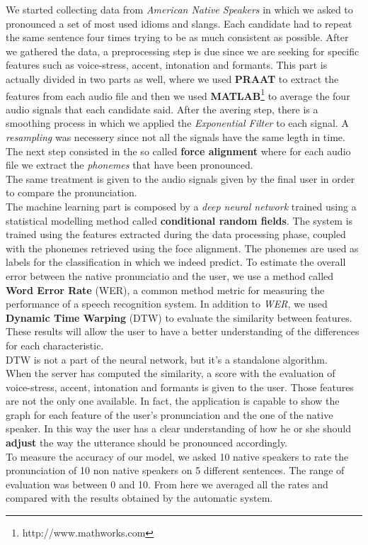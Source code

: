 \noindent We started collecting data from \textit{American Native Speakers} in which we asked to pronounced a set of most used idioms and slangs. Each candidate had to repeat the same sentence four times trying to be as much consistent as possible. After we gathered the data, a preprocessing step is due since we are seeking for specific features such as voice-stress, accent, intonation and formants. This part is actually divided in two parts as well, where we used \textbf{PRAAT}\cite{boersma2010p} to extract the features from each audio file and then we used \textbf{MATLAB}\footnote{http://www.mathworks.com} to average the four audio signals that each candidate said. After the avering step, there is a smoothing process in which we applied the \textit{Exponential Filter} to each signal. A \textit{resampling} was necessery since not all the signals have the same legth in time. The next step consisted in the so called \textbf{force alignment} where for each audio file we extract the \textit{phonemes} that have been pronounced. \\
\noindent The same treatment is given to the audio signals given by the final user in order to compare the pronunciation. \\

\noindent The machine learning part is composed by a \textit{deep neural network} trained using a statistical modelling method called \textbf{conditional random fields}. The system is trained using the features extracted during the data processing phase, coupled with the phonemes retrieved using the foce alignment. The phonemes are used as labels for the classification in which we indeed predict. To estimate the overall error between the native pronunciatio and the user, we use a method called \textbf{Word Error Rate} (WER), a common method metric for measuring the performance of a speech recognition system. In addition to \textit{WER}, we used \textbf{Dynamic Time Warping} (DTW) to evaluate the similarity between features. These results will allow the user to have a better understanding of the differences for each characteristic. \\
\noindent DTW is not a part of the neural network, but it's a standalone algorithm. \\

\noindent When the server has computed the similarity, a score with the evaluation of voice-stress, accent, intonation and formants is given to the user. Those features are not the only one available. In fact, the application is capable to show the graph for each feature of the user's pronunciation and the one of the native speaker. In this way the user has a clear understanding of how he or she should \textbf{adjust} the way the utterance should be pronounced accordingly. \\

\noindent To measure the accuracy of our model, we asked 10 native speakers to rate the pronunciation of 10 non native speakers on 5 different sentences. The range of evaluation was between 0 and 10. From here we averaged all the rates and compared with the results obtained by the automatic system.
